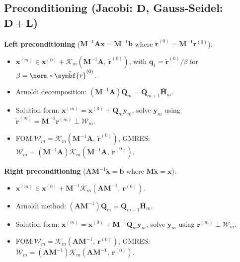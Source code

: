 \documentclass{article}
\begin{document}
\begin{minipage}[t]{126.1962963mm}
    \subsection{Preconditioning (Jacobi: \texorpdfstring{\(\symbf{D}\)}{D}, Gauss-Seidel: \texorpdfstring{\(\symbf{D} + \symbf{L}\)}{D + L})}
    \textbf{Left preconditioning} (\(\symbf{M}^{-1} \symbf{A} \symbf{x} = \symbf{M}^{-1} \symbf{b}\) where \(\tilde{\symbf{r}}^{\left( 0 \right)} = \symbf{M}^{-1} \symbf{r}^{\left( 0 \right)}\)):
    \begin{itemize}
        \item \(\symbf{x}^{\left( m \right)} \in \symbf{x}^{\left( 0 \right)} + \mathcal{K}_m\left( \symbf{M}^{-1} \symbf{A},\: \tilde{\symbf{r}}^{\left( 0 \right)} \right)\),
              with \(\symbf{q}_1 = \tilde{\symbf{r}}^{\left( 0 \right)} /
              \beta\) for \(\beta = \norm*{\tilde{\symbf{r}}^{\left( 0
              \right)}}\).
        \item Arnoldi decomposition: \(\left( \symbf{M}^{-1} \symbf{A} \right)
              \symbf{Q}_m = \symbf{Q}_{m+1} \bar{\symbf{H}}_m\).
        \item Solution form: \(\symbf{x}^{\left( m \right)} = \symbf{x}^{\left( 0 \right)} + \symbf{Q}_m \symbf{y}_m\),
              solve \(\symbf{y}_m\) using
              \(\tilde{\symbf{r}}^{\left( m \right)} = \symbf{M}^{-1} \symbf{r}^{\left( m \right)} \perp \symbf{\mathcal{W}}_m\).
        \item FOM:\@ \(\symbf{\mathcal{W}}_m = \symbf{\mathcal{K}}_m\left( \symbf{M}^{-1} \symbf{A},\: \tilde{\symbf{r}}^{\left( 0 \right)} \right)\),
              GMRES:\@ \(\symbf{\mathcal{W}}_m = \left( \symbf{M}^{-1} \symbf{A} \right) \symbf{\mathcal{K}}_m\left( \symbf{M}^{-1} \symbf{A},\: \tilde{\symbf{r}}^{\left( 0 \right)} \right)\).
    \end{itemize}
    \textbf{Right preconditioning} (\(\symbf{A} \symbf{M}^{-1} \tilde{\symbf{x}} = \symbf{b}\) where \(\symbf{M} \tilde{\symbf{x}} = \symbf{x}\)):
    \begin{itemize}
        \item \(\symbf{x}^{\left( m \right)} \in \symbf{x}^{\left( 0 \right)} + \symbf{M}^{-1} \mathcal{K}_m\left( \symbf{A} \symbf{M}^{-1},\: \symbf{r}^{\left( 0 \right)} \right)\).
        \item Arnoldi method: \(\left( \symbf{A} \symbf{M}^{-1} \right) \symbf{Q}_m = \symbf{Q}_{m+1} \bar{\symbf{H}}_m\).
        \item Solution form: \(\symbf{x}^{\left( m \right)} = \symbf{x}^{\left( 0 \right)} + \symbf{M}^{-1} \symbf{Q}_m \symbf{y}_m\), solve \(\symbf{y}_m\) using \(\symbf{r}^{\left( m \right)} \perp \symbf{\mathcal{W}}_m\).
        \item FOM:\@ \(\symbf{\mathcal{W}}_m = \symbf{\mathcal{K}}_m\left( \symbf{A} \symbf{M}^{-1},\: \symbf{r}^{\left( 0 \right)} \right)\),
              GMRES:\@ \(\symbf{\mathcal{W}}_m = \left( \symbf{A} \symbf{M}^{-1} \right) \symbf{\mathcal{K}}_m\left( \symbf{A} \symbf{M}^{-1},\: \symbf{r}^{\left( 0 \right)} \right)\).
    \end{itemize}
\end{minipage}
\end{document}
